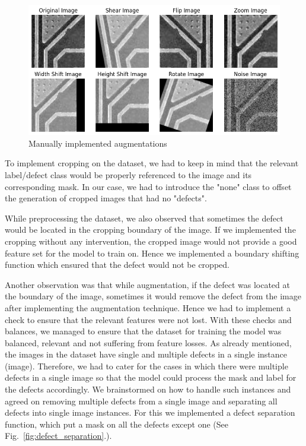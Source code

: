 \documentclass[12pt]{article}
\begin{document}
\begin{figure}[h]
    \centering
    \includegraphics[width=1\textwidth]{./graphics/manual augmentation.png}
    \caption{Manually implemented augmentations}
    \label{fig:manual_augmentation}
\end{figure}


To implement cropping on the dataset, we had to keep in mind that the relevant label/defect class would be properly referenced to the image and its corresponding mask. In our case, we had to introduce the "none" class to offset the generation of cropped images that had no "defects".

While preprocessing the dataset, we also observed that sometimes the defect would be located in the cropping boundary of the image. If we implemented the cropping without any intervention, the cropped image would not provide a good feature set for the model to train on. Hence we implemented a boundary shifting function which ensured that the defect would not be cropped.

Another observation was that while augmentation, if the defect was located at the boundary of the image, sometimes it would remove the defect from the image after implementing the augmentation
technique. Hence we had to implement a check to ensure that the relevant features were not lost. With these checks and balances, we managed to ensure that the dataset for training the model was balanced, relevant and not suffering from feature losses.
As already mentioned, the images in the dataset have single and multiple defects in a single instance (image). Therefore, we had to cater for the cases in which there were multiple defects in a single image so that the model could process the mask and label for the defects accordingly. We brainstormed on how to handle such instances and agreed on removing multiple defects from a single image and separating all defects into single image instances. For this we implemented a defect separation function, which put a mask on all the defects except one (See Fig.~\ref{fig:defect_separation}.).
\end{document}
